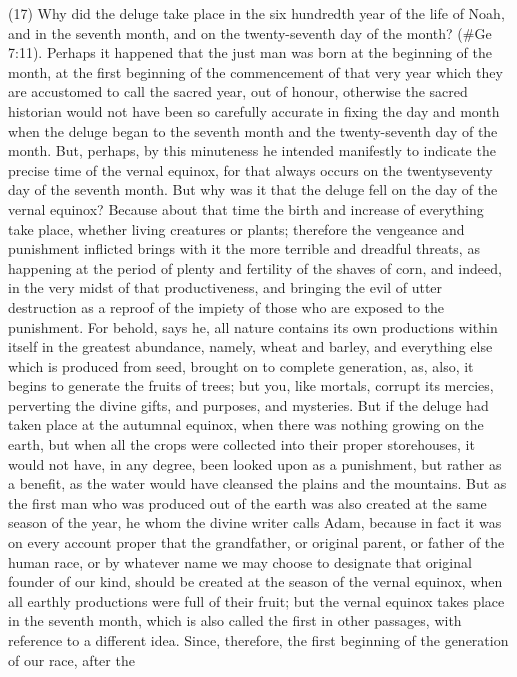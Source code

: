 (17) Why did the deluge take place in the six hundredth year of the life of Noah, and in the seventh
month, and on the twenty-seventh day of the month? (\#Ge 7:11). Perhaps it happened that the
just man was born at the beginning of the month, at the first beginning of the commencement of that
very year which they are accustomed to call the sacred year, out of honour, otherwise the sacred
historian would not have been so carefully accurate in fixing the day and month when the deluge
began to the seventh month and the twenty-seventh day of the month. But, perhaps, by this
minuteness he intended manifestly to indicate the precise time of the vernal equinox, for that
always occurs on the twentyseventy day of the seventh month. But why was it that the deluge fell on
the day of the vernal equinox? Because about that time the birth and increase of everything take
place, whether living creatures or plants; therefore the vengeance and punishment inflicted brings
with it the more terrible and dreadful threats, as happening at the period of plenty and fertility of the
shaves of corn, and indeed, in the very midst of that productiveness, and bringing the evil of utter
destruction as a reproof of the impiety of those who are exposed to the punishment. For behold,
says he, all nature contains its own productions within itself in the greatest abundance, namely,
wheat and barley, and everything else which is produced from seed, brought on to complete
generation, as, also, it begins to generate the fruits of trees; but you, like mortals, corrupt its
mercies, perverting the divine gifts, and purposes, and mysteries. But if the deluge had taken place
at the autumnal equinox, when there was nothing growing on the earth, but when all the crops were
collected into their proper storehouses, it would not have, in any degree, been looked upon as a
punishment, but rather as a benefit, as the water would have cleansed the plains and the
mountains. But as the first man who was produced out of the earth was also created at the same
season of the year, he whom the divine writer calls Adam, because in fact it was on every account
proper that the grandfather, or original parent, or father of the human race, or by whatever name
we may choose to designate that original founder of our kind, should be created at the season of
the vernal equinox, when all earthly productions were full of their fruit; but the vernal equinox takes
place in the seventh month, which is also called the first in other passages, with reference to a
different idea. Since, therefore, the first beginning of the generation of our race, after the
